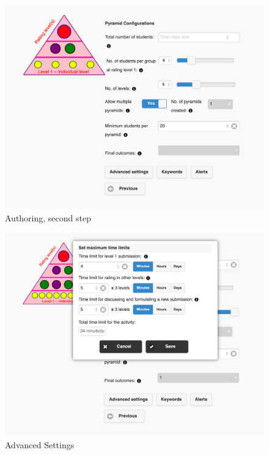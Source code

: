 \begin{figure}[!h]
    \includegraphics[clip,width=\columnwidth]{Figures/pyramidapp2.png}%
\caption{Authoring, second step}
\label{fig:P2}
\end{figure}
\begin{figure}[!h]
    \includegraphics[clip,width=\columnwidth]{Figures/pyramidapp3.png}%
\caption{Advanced Settings}
\label{fig:P3}
\end{figure}
